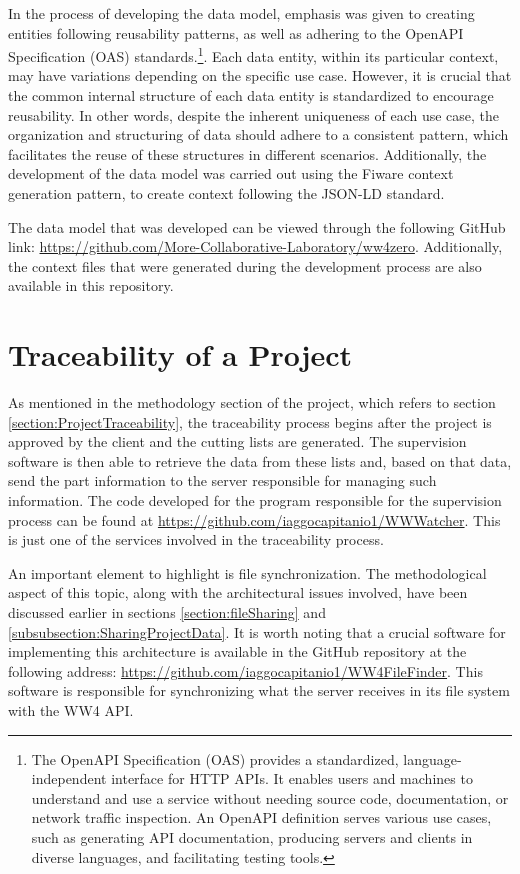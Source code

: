 In the process of developing the data model, emphasis was given to creating entities following reusability patterns, as well as adhering to the OpenAPI Specification (OAS) standards.\footnote{The OpenAPI Specification (OAS) provides a standardized, language-independent interface for HTTP APIs. It enables users and machines to understand and use a service without needing source code, documentation, or network traffic inspection. An OpenAPI definition serves various use cases, such as generating API documentation, producing servers and clients in diverse languages, and facilitating testing tools.}. Each data entity, within its particular context, may have variations depending on the specific use case. However, it is crucial that the common internal structure of each data entity is standardized to encourage reusability. In other words, despite the inherent uniqueness of each use case, the organization and structuring of data should adhere to a consistent pattern, which facilitates the reuse of these structures in different scenarios. Additionally, the development of the data model was carried out using the Fiware context generation pattern, to create context following the JSON-LD standard.

The data model that was developed can be viewed through the following GitHub link: \url{https://github.com/More-Collaborative-Laboratory/ww4zero}. Additionally, the context files that were generated during the development process are also available in this repository.

\section{Traceability of a Project}\label{section:project}

As mentioned in the methodology section of the project, which refers to section \ref{section:ProjectTraceability}, the traceability process begins after the project is approved by the client and the cutting lists are generated. The supervision software is then able to retrieve the data from these lists and, based on that data, send the part information to the server responsible for managing such information. The code developed for the program responsible for the supervision process can be found at \url{https://github.com/iaggocapitanio1/WWWatcher}. This is just one of the services involved in the traceability process.

An important element to highlight is file synchronization. The methodological aspect of this topic, along with the architectural issues involved, have been discussed earlier in sections \ref{section:fileSharing} and \ref{subsubsection:SharingProjectData}. It is worth noting that a crucial software for implementing this architecture is available in the GitHub repository at the following address: \url{https://github.com/iaggocapitanio1/WW4FileFinder}. This software is responsible for synchronizing what the server receives in its file system with the WW4 API.

